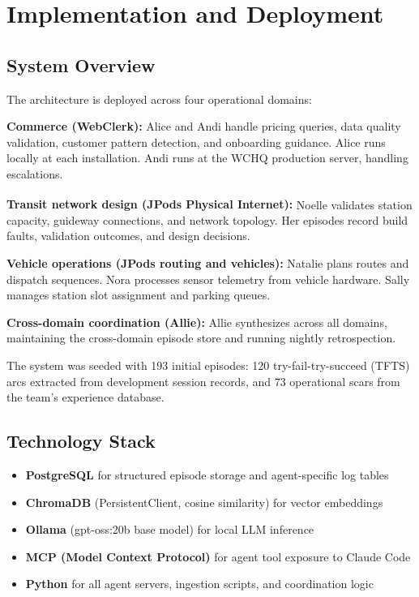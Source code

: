\documentclass[11pt,a4paper]{article}
\begin{document}
\section{Implementation and Deployment}

\subsection{System Overview}

The architecture is deployed across four operational domains:

\textbf{Commerce (WebClerk):} Alice and Andi handle pricing queries, data quality validation, customer pattern detection, and onboarding guidance. Alice runs locally at each installation. Andi runs at the WCHQ production server, handling escalations.

\textbf{Transit network design (JPods Physical Internet\textsuperscript{\textregistered}):} Noelle validates station capacity, guideway connections, and network topology. Her episodes record build faults, validation outcomes, and design decisions.

\textbf{Vehicle operations (JPods routing and vehicles):} Natalie plans routes and dispatch sequences. Nora processes sensor telemetry from vehicle hardware. Sally manages station slot assignment and parking queues.

\textbf{Cross-domain coordination (Allie):} Allie synthesizes across all domains, maintaining the cross-domain episode store and running nightly retrospection.

The system was seeded with 193 initial episodes: 120 try-fail-try-succeed (TFTS) arcs extracted from development session records, and 73 operational scars from the team's experience database.

\subsection{Technology Stack}

\begin{itemize}
    \item \textbf{PostgreSQL} for structured episode storage and agent-specific log tables
    \item \textbf{ChromaDB} (PersistentClient, cosine similarity) for vector embeddings
    \item \textbf{Ollama} (gpt-oss:20b base model) for local LLM inference
    \item \textbf{MCP (Model Context Protocol)} for agent tool exposure to Claude Code
    \item \textbf{Python} for all agent servers, ingestion scripts, and coordination logic
\end{itemize}
\end{document}
